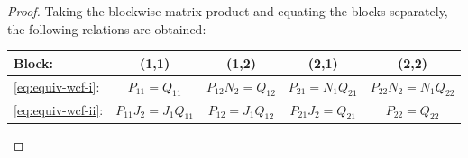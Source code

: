 \documentclass[]{book}
\theoremstyle{definition}
\theoremstyle{definition}
\theoremstyle{definition}
\theoremstyle{definition}
\theoremstyle{remark}
\begin{document}
\begin{proof}
Taking the blockwise matrix product and equating the blocks separately, the following relations are obtained:

\begin{longtable}[]{@{}lcccc@{}}
\toprule
\begin{minipage}[b]{0.11\columnwidth}\raggedright
Block:\strut
\end{minipage} & \begin{minipage}[b]{0.19\columnwidth}\centering
(1,1)\strut
\end{minipage} & \begin{minipage}[b]{0.19\columnwidth}\centering
(1,2)\strut
\end{minipage} & \begin{minipage}[b]{0.19\columnwidth}\centering
(2,1)\strut
\end{minipage} & \begin{minipage}[b]{0.19\columnwidth}\centering
(2,2)\strut
\end{minipage}\tabularnewline
\midrule
\endhead
\begin{minipage}[t]{0.11\columnwidth}\raggedright
\eqref{eq:equiv-wcf-i}:\strut
\end{minipage} & \begin{minipage}[t]{0.19\columnwidth}\centering
\(P_{11}=Q_{11}\)\strut
\end{minipage} & \begin{minipage}[t]{0.19\columnwidth}\centering
\(P_{12}N_2=Q_{12}\)\strut
\end{minipage} & \begin{minipage}[t]{0.19\columnwidth}\centering
\(P_{21}=N_1Q_{21}\)\strut
\end{minipage} & \begin{minipage}[t]{0.19\columnwidth}\centering
\(P_{22}N_2=N_1Q_{22}\)\strut
\end{minipage}\tabularnewline
\begin{minipage}[t]{0.11\columnwidth}\raggedright
\eqref{eq:equiv-wcf-ii}:\strut
\end{minipage} & \begin{minipage}[t]{0.19\columnwidth}\centering
\(P_{11}J_2=J_1Q_{11}\)\strut
\end{minipage} & \begin{minipage}[t]{0.19\columnwidth}\centering
\(P_{12}=J_1Q_{12}\)\strut
\end{minipage} & \begin{minipage}[t]{0.19\columnwidth}\centering
\(P_{21}J_2=Q_{21}\)\strut
\end{minipage} & \begin{minipage}[t]{0.19\columnwidth}\centering
\(P_{22}=Q_{22}\)\strut
\end{minipage}\tabularnewline
\bottomrule
\end{longtable}


\end{proof}
\end{document}
